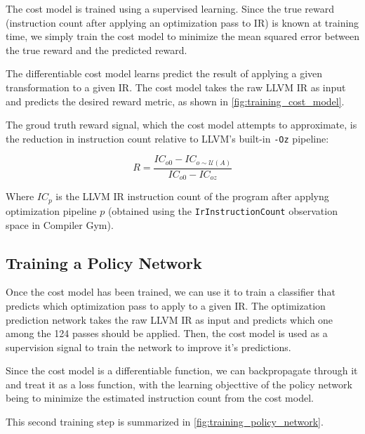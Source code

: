 \documentclass[conference]{IEEEtran}
\begin{document}
The cost model is trained using a supervised learning. Since the true reward
(instruction count after applying an optimization pass to IR) is known at
training time, we simply train the cost model to minimize the mean squared error
between the true reward and the predicted reward.

The differentiable cost model learns predict the result of applying a given
transformation to a given IR. The cost model takes the raw LLVM IR as input and
predicts the desired reward metric, as shown in \ref{fig:training_cost_model}.

The groud truth reward signal, which the cost model attempts to approximate, is
the reduction in instruction count relative to LLVM's built-in \texttt{-Oz}
pipeline:

\[ R = \frac{IC_{o0} - IC_{o \sim \mathcal{U}(A)}}{IC_{o0} - IC_{oz}} \]

Where \(IC_p\) is the LLVM IR instruction count of the program after applyng
optimization pipeline \(p\) (obtained using the \texttt{IrInstructionCount}
observation space in Compiler Gym).

\subsection{Training a Policy Network}

Once the cost model has been trained, we can use it to train a classifier that
predicts which optimization pass to apply to a given IR. The optimization
prediction network takes the raw LLVM IR as input and predicts which one among
the 124 passes should be applied. Then, the cost model is used as a supervision
signal to train the network to improve it's predictions.

Since the cost model is a differentiable function, we can backpropagate through
it and treat it as a loss function, with the learning objecttive of the policy
network being to minimize the estimated instruction count from the cost model.

This second training step is summarized in \ref{fig:training_policy_network}.
\end{document}
